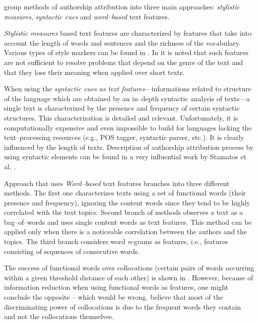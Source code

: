 \documentclass[11pt,english]{article}
\begin{document}
\begin{multicols}{2}
\citet{coyotl2006authorship} group methods of authorship attribution into three
main approaches: \emph{stylistic measures}, \emph{syntactic cues} and
\emph{word--based} text features.

\emph{Stylistic measures} based text features are characterized by features that
take into account the length of words and sentences and the richness of the
vocabulary. Various types of style markers can be found in
\citep{luyckx2005shallow}. In \citep{coyotl2006authorship} it is noted that such
features are not sufficient to resolve problems that depend on the genre of the
text and that they lose their meaning when applied over short texts.

When using the \emph{syntactic cues as text features}---informations
related to structure of the language which are obtained by an in--depth syntactic
analysis of texts---a single text is characterized by the presence and
frequency of certain syntactic structures. This characterization is detailed and relevant.
Unfortunately, it is computationally expensive and even impossible to build for
languages lacking the text--processing resources (e.g., POS tagger, syntactic
parser, etc.). It is clearly influenced by the length of texts. Description of
authorship attribution process by using syntactic elements can be found in a very influential work by Stamatos et al.
\citep{stamatatos2001computer}.

Approach that uses \emph{Word--based} text features branches into three
different methods. The first one characterizes texts using a set of
functional words (their presence and frequency), ignoring the content words since
they tend to be highly correlated with the text topics. Second branch
of methods observes a text as a bag--of--words and uses single content words as
text features. This method can be applied only when there is a noticeable
correlation between the authors and the topics. The third branch considers
word \emph{n}-grams as features, i.e., features consisting of sequences of
consecutive words.

The success of functional words over collocations (certain pairs of words
occurring within a given threshold distance of each other) is shown in
\citep{argamon2005measuring}. However, because of information reduction when 
using functional words as features, one might conclude the opposite -- which would be
wrong. \citet{argamon2005measuring} believe that most of the discriminating power
of collocations is due to the frequent words they contain and not the
collocations themselves.


\end{multicols}
\end{document}
